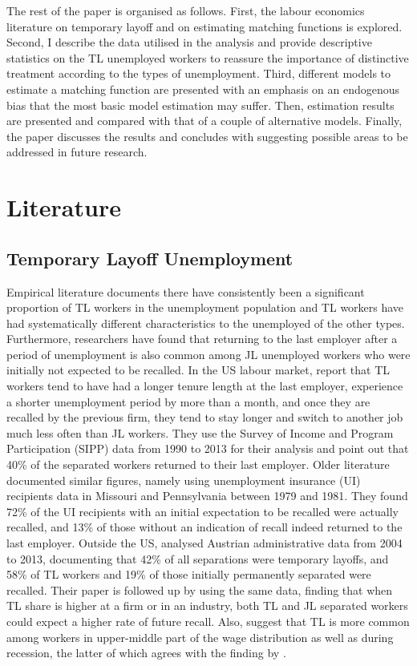 \documentclass[a4paper, 11pt, tikz]{article}
\begin{document}
The rest of the paper is organised as follows.
First, the labour economics literature on temporary layoff and on estimating matching functions is explored.
Second, I describe the data utilised in the analysis and provide descriptive statistics on the TL unemployed workers to reassure the importance of distinctive treatment according to the types of unemployment.
Third, different models to estimate a matching function are presented with an emphasis on an endogenous bias that the most basic model estimation may suffer.
Then, estimation results are presented and compared with that of a couple of alternative models.
Finally, the paper discusses the results and concludes with suggesting possible areas to be addressed in future research.

\section{Literature}
\subsection{Temporary Layoff Unemployment}
Empirical literature documents there have consistently been a significant proportion of TL workers in the unemployment population and TL workers have had systematically different characteristics to the unemployed of the other types.
Furthermore, researchers have found that returning to the last employer after a period of unemployment is also common among JL unemployed workers who were initially not expected to be recalled.
In the US labour market, \cite{fujita2017recall} report that TL workers tend to have had a longer tenure length at the last employer, experience a shorter unemployment period by more than a month, and once they are recalled by the previous firm, they tend to stay longer and switch to another job much less often than JL workers.
They use the Survey of Income and Program Participation (SIPP) data from 1990 to 2013 for their analysis and point out that 40\% of the separated workers returned to their last employer.
Older literature documented similar figures, namely \cite{katz1990impact} using unemployment insurance (UI) recipients data in Missouri and Pennsylvania between 1979 and 1981.
They found 72\% of the UI recipients with an initial expectation to be recalled were actually recalled, and 13\% of those without an indication of recall indeed returned to the last employer.
Outside the US, \cite{nekoei2015recall} analysed Austrian administrative data from 2004 to 2013, documenting that 42\% of all separations were temporary layoffs, and 58\% of TL workers and 19\% of those initially permanently separated were recalled.
Their paper is followed up by \cite{nekoei2020seven} using the same data, finding that when TL share is higher at a firm or in an industry, both TL and JL separated workers could expect a higher rate of future recall.
Also, \cite{nekoei2020seven} suggest that TL is more common among workers in upper-middle part of the wage distribution as well as during recession, the latter of which agrees with the finding by \cite{fujita2017recall}.
\end{document}
